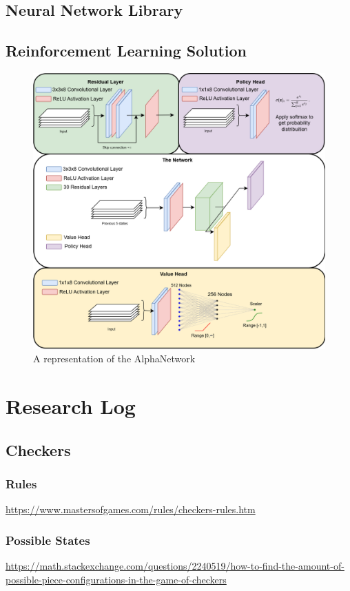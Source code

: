 \documentclass{article}
\begin{document}
    \subsection{Neural Network Library}

    \subsection{Reinforcement Learning Solution}
    \begin{figure}
        \centering
        \includegraphics[scale=0.45]{NetworkPassThrough.drawio.png}
        \caption{A representation of the AlphaNetwork}
    \end{figure}

    
    \pagebreak
    \section{Research Log}

    \subsection{Checkers}
    \subsubsection{Rules}
    \noindent \url{https://www.mastersofgames.com/rules/checkers-rules.htm}
    \subsubsection{Possible States}
    \noindent \url{https://math.stackexchange.com/questions/2240519/how-to-find-the-amount-of-possible-piece-configurations-in-the-game-of-checkers}
    
\end{document}
